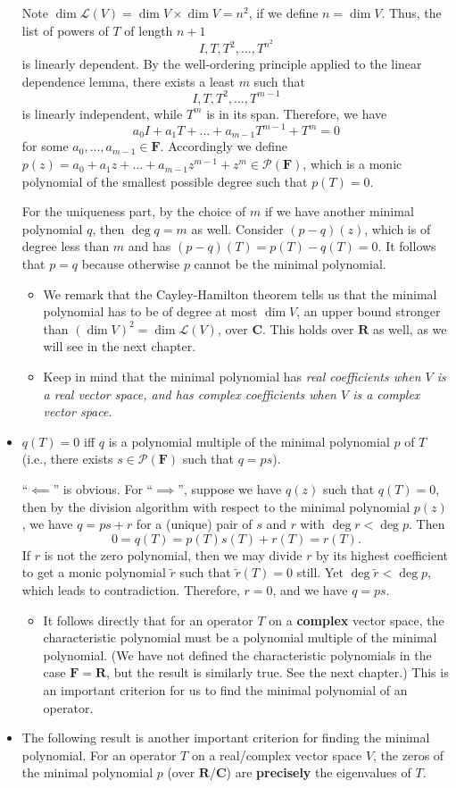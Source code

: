 \documentclass[11pt]{article}
\newcommand{\R}{\mathbf{R}}
\newcommand{\C}{\mathbf{C}}
\newcommand{\F}{\mathbf{F}}
\renewcommand{\d}{\dim}
\newcommand{\LV}{\mathcal{L}(V)}
\newcommand{\PF}{\mathcal{P}(\F)}
\begin{document}
\begin{itemize}
    Note $\d \LV = \d V \times \d V = n^2$, if we define $n = \d V$. Thus, the list of powers of $T$ of length $n+1$ \[I, T, T^2,\dots,T^{n^2}\] is linearly dependent. By the well-ordering principle applied to the linear dependence lemma, there exists a least $m$ such that \[I,T,T^2,\dots,T^{m-1}\] is linearly independent, while $T^m$ is in its span. Therefore, we have \[a_0 I + a_1 T + \dots + a_{m-1} T^{m-1} + T^m = 0\] for some $a_0,\dots,a_{m-1} \in \F$. Accordingly we define $p(z) = a_0 + a_1 z +\dots+ a_{m-1}z^{m-1} + z^m \in \PF$, which is a monic polynomial of the smallest possible degree such that $p(T) = 0$.

    For the uniqueness part, by the choice of $m$ if we have another minimal polynomial $q$, then $\deg q = m$ as well. Consider $(p-q)(z)$, which is of degree less than $m$ and has $(p-q)(T) = p(T) - q(T) = 0$. It follows that $p = q$ because otherwise $p$ cannot be the minimal polynomial.
    \begin{itemize}
        \item We remark that the Cayley-Hamilton theorem tells us that the minimal polynomial has to be of degree at most $\d V$, an upper bound stronger than $(\d V)^2 = \d \LV$, over $\C$. This holds over $\R$ as well, as we will see in the next chapter.
        \item Keep in mind that the minimal polynomial has \emph{real coefficients when $V$ is a real vector space, and has complex coefficients when $V$ is a complex vector space}.
    \end{itemize}
    \item $q(T) = 0$ iff $q$ is a polynomial multiple of the minimal polynomial $p$ of $T$ (i.e., there exists $s \in \PF$ such that $q=ps$).

    ``$\impliedby$'' is obvious. For ``$\implies$'', suppose we have $q(z)$ such that $q(T) = 0$, then by the division algorithm with respect to the minimal polynomial $p(z)$, we have $q = ps+r$ for a (unique) pair of $s$ and $r$ with $\deg r < \deg p$. Then \[0 = q(T) = p(T)s(T)+r(T) = r(T).\] If $r$ is not the zero polynomial, then we may divide $r$ by its highest coefficient to get a monic polynomial $\tilde{r}$ such that $\tilde{r}(T) = 0$ still. Yet $\deg \tilde{r} < \deg p$, which leads to contradiction. Therefore, $r = 0$, and we have $q = ps$.
    \begin{itemize}
        \item It follows directly that for an operator $T$ on a \textbf{complex} vector space, the characteristic polynomial must be a polynomial multiple of the minimal polynomial. (We have not defined the characteristic polynomials in the case $\F = \R$, but the result is similarly true. See the next chapter.) This is an important criterion for us to find the minimal polynomial of an operator.
    \end{itemize}
    \item The following result is another important criterion for finding the minimal polynomial. For an operator $T$ on a real/complex vector space $V$, the zeros of the minimal polynomial $p$ (over $\R$/$\C$) are \textbf{precisely} the eigenvalues of $T$.


\end{itemize}
\end{document}
